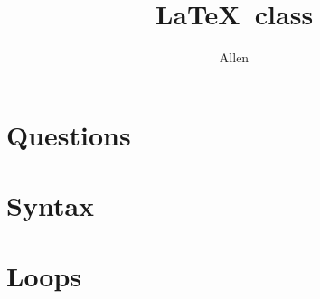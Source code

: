\documentclass[9pt,a4paper,twoside]{tau-class/tau}
\title{\LaTeX\ class}
\author[a,1]{Allen}
\affil[a]{Master of Science Physics}
\begin{document}
		
    \maketitle 
    \thispagestyle{firststyle} \tauabstract 
    \tableofcontents
    \linenumbers 
    
\section{Questions}
\section{Syntax}
\section{Loops}		
\end{document}
